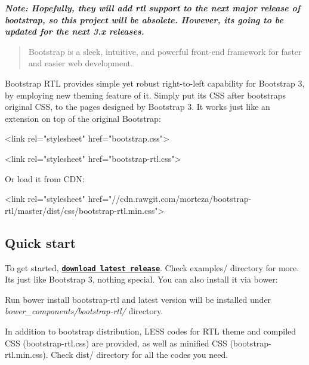



{\itshape {\bfseries Note\+: Hopefully, they will add rtl support to the next major release of bootstrap, so this project will be absolete. However, it\textquotesingle{}s going to be updated for the next 3.\+x releases.}}

\begin{quote}
Bootstrap is a sleek, intuitive, and powerful front-\/end framework for faster and easier web development. \end{quote}


Bootstrap R\+TL provides simple yet robust right-\/to-\/left capability for Bootstrap 3, by employing new theming feature of it. Simply put its C\+SS after bootstrap\textquotesingle{}s original C\+SS, to the pages designed by Bootstrap 3. It works just like an extension on top of the original Bootstrap\+:


\begin{DoxyCode}
<link rel="stylesheet" href="bootstrap.css">


<link rel="stylesheet" href="bootstrap-rtl.css">
\end{DoxyCode}


Or load it from C\+DN\+:


\begin{DoxyCode}
<link rel="stylesheet" href="//cdn.rawgit.com/morteza/bootstrap-rtl/master/dist/css/bootstrap-rtl.min.css">
\end{DoxyCode}


\subsection*{Quick start}

To get started, {\bfseries \href{https://github.com/morteza/bootstrap-rtl/releases/latest}{\tt download latest release}}. Check {\ttfamily examples/} directory for more. It\textquotesingle{}s just like Bootstrap 3, nothing special. You can also install it via bower\+:


\begin{DoxyItemize}
\item Run {\ttfamily bower install bootstrap-\/rtl} and latest version will be installed under {\itshape bower\+\_\+components/bootstrap-\/rtl/} directory.
\end{DoxyItemize}

In addition to bootstrap distribution, L\+E\+SS codes for R\+TL theme and compiled C\+SS ({\ttfamily bootstrap-\/rtl.\+css}) are provided, as well as minified C\+SS ({\ttfamily bootstrap-\/rtl.\+min.\+css}). Check {\ttfamily dist/} directory for all the codes you need.

